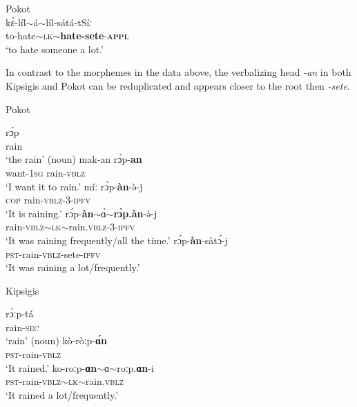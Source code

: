\documentclass[output=paper,colorlinks,citecolor=brown
]{langscibook}
\begin{document}
\ea Pokot \label{ex:fiebig:PokotBoth} \\
\gll kɛ̀-líl$\sim$á$\sim$líl-sátá-tSíː\\
to-hate$\sim$\textsc{lk}$\sim$\textbf{hate-sete}-\textsc{\textbf{appl}}\\
\glt `to hate someone a lot.'	
\z 

\noindent In contrast to the morphemes in the data above, the verbalizing head \textit{-an} in both Kipsigis and Pokot can be reduplicated and appears closer to the root then \textit{-sete}. 


\ea Pokot \label{ex:fiebig:PokotRain}
\begin{xlist}
    \ex
    \gll rɔ́p\\
	rain\\
	\glt `the rain' (noun)
	\ex
    \gll mak-an rɔ́p-\textbf{an}\\
	want-\textsc{1sg} rain-\textsc{vblz}\\
	\glt `I want it to rain.'
	\ex
    \gll míː rɔ̀p-\textbf{àn}-ə̀-j\\
	\textsc{cop} rain-\textsc{vblz}-3-\textsc{ipfv}\\
	\glt `It is raining.' 
	\ex \label{ex:fiebig:rainRED}
    \gll rɔ́p-\textbf{àn}$\sim$ɑ̀$\sim$\textbf{rɔ̀p.\textbf{àn}}-ə́-j\\
	rain-\textsc{vblz}$\sim$\textsc{lk}$\sim$rain.\textsc{vblz}-3-\textsc{ipfv}\\
	\glt `It was raining frequently/all the time.' 	
	\ex \label{ex:fiebig:rainSete}
    \gll rɔ́p-\textbf{àn}-sàtɔ́-j\\
	\textsc{pst}-rain-\textsc{vblz}-sete-\textsc{ipfv}\\
	\glt `It was raining a lot/frequently.' 
\end{xlist}
\z

\ea Kipsigis \label{ex:fiebig:kip.rain}
\begin{xlist}
    \ex
    \gll rɔ̀ːp-tá\\
	rain-\textsc{sec}\\
	\glt `rain' (noun)
	\ex
    \gll kò-ròːp-\textbf{ɑ́n}\\
	\textsc{pst}-rain-\textsc{vblz}\\
	\glt `It rained.'
	\ex \label{ex:fiebig:rain-an-red}
    \gll ko-roːp-\textbf{ɑn}$\sim$ɑ$\sim$roːp.\textbf{ɑn}-i\\
	\textsc{pst}-rain-\textsc{vblz$\sim$lk}$\sim$rain.\textsc{vblz}\\ 
	\glt `It rained a lot/frequently.'
\end{xlist}
\z
\end{document}
